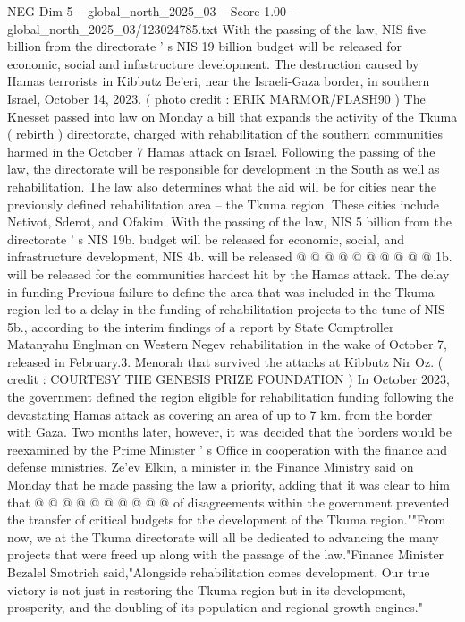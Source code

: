 \begin{textsample}{NEG Dim 5 – global\_north\_2025\_03 – Score 1.00 – global\_north\_2025\_03/123024785.txt}  \label{ex:f5_neg_299}
With the passing of the law, NIS five billion from the directorate ' s NIS 19 billion budget will be released for economic, social and infastructure development.
The destruction caused by Hamas terrorists in Kibbutz Be'eri, near the Israeli-Gaza border, in southern Israel, October 14, 2023. ( photo credit : ERIK MARMOR/FLASH90 ) The Knesset passed into law on Monday a bill that expands the activity of the Tkuma ( rebirth ) directorate, charged with rehabilitation of the southern communities harmed in the October 7 Hamas attack on Israel.
Following the passing of the law, the directorate will be responsible for development in the South as well as rehabilitation.
The law also determines what the aid will be for cities near the previously defined rehabilitation area -- the Tkuma region.
These cities include Netivot, Sderot, and Ofakim.
With the passing of the law, NIS 5 billion from the directorate ' s NIS 19b. budget will be released for economic, social, and infrastructure development, NIS 4b. will be released @ @ @ @ @ @ @ @ @ @ 1b. will be released for the communities hardest hit by the Hamas attack.
The delay in funding Previous failure to define the area that was included in the Tkuma region led to a delay in the funding of rehabilitation projects to the tune of NIS 5b., according to the interim findings of a report by State Comptroller Matanyahu Englman on Western Negev rehabilitation in the wake of October 7, released in February.3.
Menorah that survived the attacks at Kibbutz Nir Oz. ( credit : COURTESY THE GENESIS PRIZE FOUNDATION ) In October 2023, the government defined the region eligible for rehabilitation funding following the devastating Hamas attack as covering an area of up to 7 km. from the border with Gaza.
Two months later, however, it was decided that the borders would be reexamined by the Prime Minister ' s Office in cooperation with the finance and defense ministries.
Ze'ev Elkin, a minister in the Finance Ministry said on Monday that he made passing the law a priority, adding that it was clear to him that @ @ @ @ @ @ @ @ @ @ of disagreements within the government prevented the transfer of critical budgets for the development of the Tkuma region.""From now, we at the Tkuma directorate will all be dedicated to advancing the many projects that were freed up along with the passage of the law."Finance Minister Bezalel Smotrich said,"Alongside rehabilitation comes development.
Our true victory is not just in restoring the Tkuma region but in its development, prosperity, and the doubling of its population and regional growth engines."

\end{textsample}
